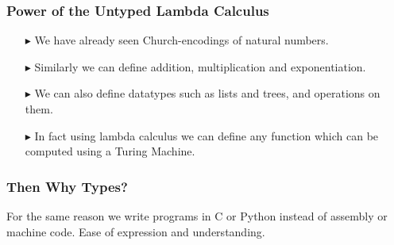 \documentclass[14pt,compress]{beamer}
\begin{document}
\begin{frame}\label{frame : power of lambda}
\frametitle{Power of the Untyped Lambda Calculus}
\begin{enumerate}
\pause
\item[$\blacktriangleright$] We have already seen Church-encodings of natural numbers.
\pause
\item[$\blacktriangleright$] Similarly we can define addition, multiplication and exponentiation.
\pause
\item[$\blacktriangleright$] We can also define datatypes such as lists and trees, and operations on them.
\pause
\item[$\blacktriangleright$] In fact using lambda calculus we can define any function
which can be computed using a Turing Machine.
\end{enumerate}
\end{frame}

\begin{frame}\label{frame : why types}
\frametitle{Then Why Types?}

For the same reason we write programs in C or Python instead of assembly or machine code.
Ease of expression and understanding. 

\end{frame}
\end{document}
